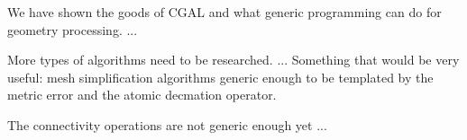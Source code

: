 We have shown the goods of CGAL and what generic programming can do
for geometry processing. ...

More types of algorithms need to be researched. ...  Something that
would be very useful: mesh simplification algorithms generic enough to
be templated by the metric error and the atomic decmation operator.

The connectivity operations are not generic enough yet ...

